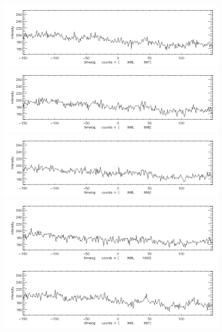 \documentclass[12pt]{article}
\begin{document}
\begin{figure}[here]
\includegraphics[width=7in]{lc06.png}
\includegraphics[width=7in]{lc07.png}
\includegraphics[width=7in]{lc08.png}
\includegraphics[width=7in]{lc09.png}
\includegraphics[width=7in]{lc10.png}
\end{figure}
\newpage
\end{document}
